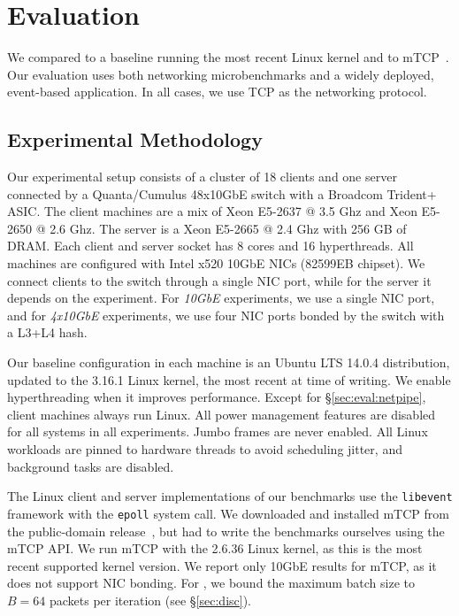 
\section{Evaluation}
\label{sec:eval}


We compared \ix to a baseline running the most recent Linux kernel and
to mTCP~\cite{jeong2014mtcp}. Our evaluation uses both networking
microbenchmarks and a widely deployed, event-based application. In all
cases, we use TCP as the networking protocol.

\subsection{Experimental Methodology}
\label{sec:eval:setup}

 

Our experimental setup consists of a cluster of 18 clients and one
server connected by a Quanta/Cumulus 48x10GbE switch with a Broadcom
Trident+ ASIC.  The client machines are a mix of Xeon E5-2637 @ 3.5
Ghz and Xeon E5-2650 @ 2.6 Ghz. The server is a Xeon E5-2665 @ 2.4 Ghz
with 256 GB of DRAM.  Each client and server socket has 8 cores and 16
hyperthreads. All machines are configured with Intel x520 10GbE NICs
(82599EB chipset). We connect clients to the switch through a single
NIC port, while for the server it depends on the experiment. For
\emph{10GbE} experiments, we use a single NIC port, and for
\emph{4x10GbE} experiments, we use four NIC ports bonded by the switch
with a L3+L4 hash.

Our baseline configuration in each
machine is an Ubuntu LTS 14.0.4 distribution, updated to the 3.16.1 Linux kernel, the most
recent at time of writing.
We enable hyperthreading when it improves performance. Except for
\S\ref{sec:eval:netpipe}, client machines always run Linux. All power
management features are disabled for all systems in all
experiments. Jumbo frames are never enabled. All Linux workloads
are pinned to hardware threads to avoid scheduling jitter, and
background tasks are disabled.


The Linux client and server implementations of our benchmarks use the
\texttt{libevent} framework with the \texttt{epoll} system call.  We
downloaded and installed mTCP from the public-domain
release~\cite{url:mtcp}, but had to write the benchmarks ourselves
using the mTCP API.  We run mTCP with the 2.6.36 Linux kernel, as this
is the most recent supported kernel version.  We report only 10GbE
results for mTCP, as it does not support NIC bonding. For \ix, we
bound the maximum batch size to $B=64$ packets per iteration (see
\S\ref{sec:disc}).



